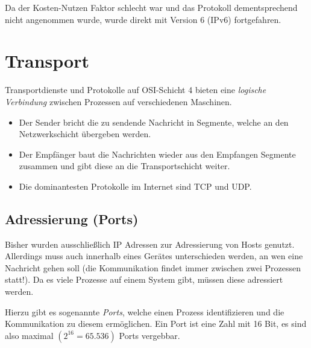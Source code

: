 			Da der Kosten-Nutzen Faktor schlecht war und das Protokoll dementsprechend nicht angenommen wurde, wurde direkt mit Version 6 (IPv6) fortgefahren.

\chapter{Transport}
    Transportdienste und Protokolle auf OSI-Schicht 4 bieten eine \textit{logische Verbindung} zwischen Prozessen auf verschiedenen Maschinen.
    \begin{itemize}
    	\item Der Sender bricht die zu sendende Nachricht in Segmente, welche an den Netzwerkschicht übergeben werden.
    	\item Der Empfänger baut die Nachrichten wieder aus den Empfangen Segmente zusammen und gibt diese an die Transportschicht weiter.
    	\item Die dominantesten Protokolle im Internet sind TCP und UDP.
    \end{itemize}

    \section{Adressierung (Ports)}
        Bisher wurden ausschließlich IP Adressen zur Adressierung von Hosts genutzt. Allerdings muss auch innerhalb eines Gerätes unterschieden werden, an wen eine Nachricht gehen soll (die Kommunikation findet immer zwischen zwei Prozessen statt!). Da es viele Prozesse auf einem System gibt, müssen diese adressiert werden.
        
        Hierzu gibt es sogenannte \textit{Ports}, welche einen Prozess identifizieren und die Kommunikation zu diesem ermöglichen. Ein Port ist eine Zahl mit 16 Bit, es sind also maximal \(( 2 ^ {16} = 65.536 )\) Ports vergebbar.
        
        
